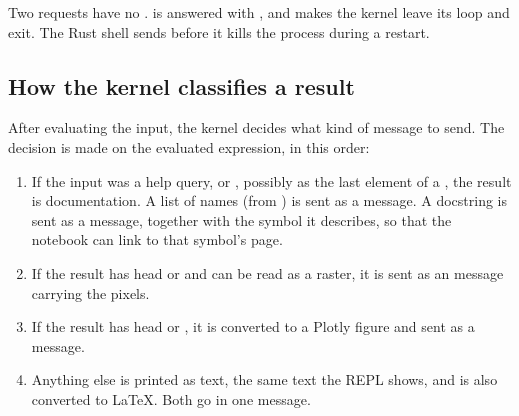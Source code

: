 \begin{sloppypar}
Two requests have no .  is answered with
, and  makes the kernel
leave its loop and exit. The Rust shell sends  before it kills the
process during a restart.
\end{sloppypar}

\subsection{How the kernel classifies a result}

After evaluating the input, the kernel decides what kind of message to send.
The decision is made on the evaluated expression, in this order:

\begin{enumerate}
\item If the input was a help query,  or
  , possibly as the last element of a
  , the result is documentation. A list of names (from
  ) is sent as a  message. A docstring is sent as
  a  message, together with the symbol it describes, so that the
  notebook can link to that symbol's page.
\item If the result has head  or  and can be read
  as a raster, it is sent as an  message carrying the pixels.
\item If the result has head  or , it is
  converted to a Plotly figure and sent as a  message.
\item Anything else is printed as text, the same text the REPL shows, and is
  also converted to \LaTeX{}. Both go in one  message.
\end{enumerate}


